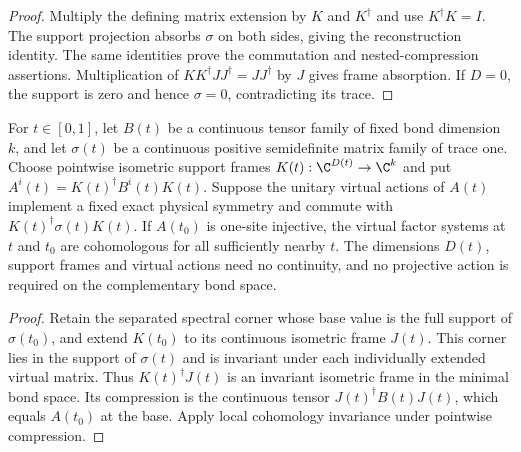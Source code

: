 \begin{proof}\leanok
    Multiply the defining matrix extension by $K$ and $K^\dagger$ and
    use $K^\dagger K=I$. The support projection absorbs $\sigma$ on
    both sides, giving the reconstruction identity. The same identities
    prove the commutation and nested-compression assertions.
    Multiplication of $KK^\dagger JJ^\dagger=JJ^\dagger$ by $J$ gives
    frame absorption. If $D=0$, the support is zero and hence
    $\sigma=0$, contradicting its trace.
\end{proof}

\begin{lemma}
    \label{thm:spt_supported_density_class_invariance}
    \leanok
    For $t\in[0,1]$, let $B(t)$ be a continuous tensor family of fixed
    bond dimension $k$, and let $\sigma(t)$ be a continuous positive semidefinite matrix
    family of trace one. Choose pointwise isometric support frames
    $K(t):\C^{D(t)}\to\C^k$ and put
    $A^i(t)=K(t)^\dagger B^i(t)K(t)$.
    Suppose the unitary virtual actions of $A(t)$ implement a
    fixed exact physical symmetry and commute with
    $K(t)^\dagger\sigma(t)K(t)$.
    If $A(t_0)$ is one-site injective, the virtual factor systems at
    $t$ and $t_0$ are cohomologous for all sufficiently nearby $t$.
    The dimensions $D(t)$, support frames and virtual actions need no
    continuity, and no projective action is required on the complementary
    bond space.
\end{lemma}

\begin{proof}\leanok
    Retain the separated spectral corner whose base value is the full
    support of $\sigma(t_0)$, and extend $K(t_0)$ to its continuous
    isometric frame $J(t)$. This corner lies in the support of
    $\sigma(t)$ and is invariant under each individually extended virtual
    matrix. Thus $K(t)^\dagger J(t)$ is an invariant isometric frame in
    the minimal bond space. Its compression is the continuous
    tensor $J(t)^\dagger B(t)J(t)$, which equals $A(t_0)$ at the base.
    Apply local cohomology invariance under pointwise compression.
\end{proof}

